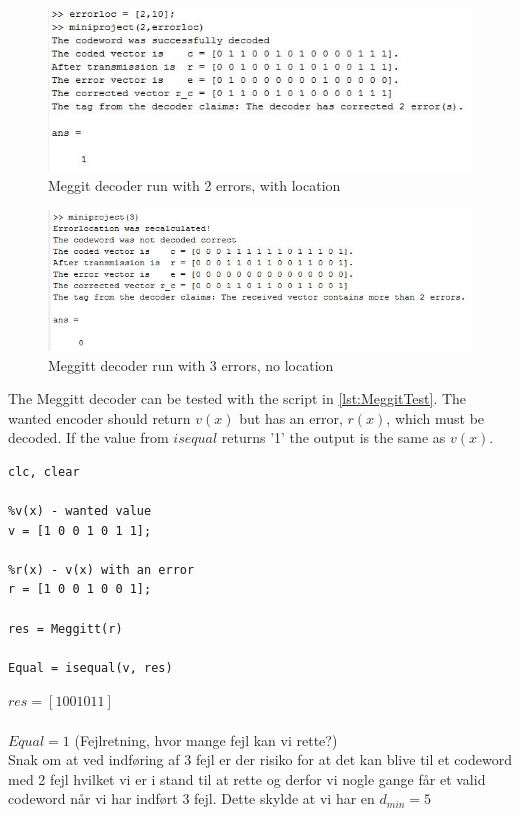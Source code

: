 \documentclass[Main]{subfiles}
\begin{document}
\begin{figure}[h!]
\centering
\includegraphics[width=0.7\linewidth]{./Picture/result-2-errors-location}
\caption{Meggit decoder run with 2 errors, with location}
\label{fig:result-2-errors-location}
\end{figure}

\begin{figure}[h!]
\centering
\includegraphics[width=0.7\linewidth]{./Picture/result-3-errors}
\caption{Meggitt decoder run with 3 errors, no location}
\label{fig:result-3-errors}
\end{figure}






The Meggitt decoder can be tested with the script in \codeTitle \ref{lst:MeggitTest}.
The wanted encoder should return $v(x)$ but has an error, $r(x)$, which must be decoded.
If the value from $isequal$ returns '1' the output is the same as $v(x)$.

\begin{lstlisting}[caption=Meggitt test script, style=Code-Matlab, label=lst:MeggitTest]
%Meggitt decoder
clc, clear

%v(x) - wanted value
v = [1 0 0 1 0 1 1];

%r(x) - v(x) with an error
r = [1 0 0 1 0 0 1];

res = Meggitt(r)

Equal = isequal(v, res)
\end{lstlisting}

$res = [1 0 0 1 0 1 1]$
\\
\\
$Equal = 1 $
(Fejlretning, hvor mange fejl kan vi rette?)\\
Snak om at ved indføring af 3 fejl er der risiko for at det kan blive til et codeword med 2 fejl hvilket vi er i stand til at rette og derfor vi nogle gange får et valid codeword når vi har indført 3 fejl. Dette skylde at vi har en $d_{min}=5$
\end{document}
